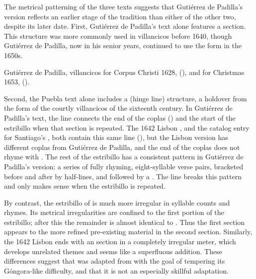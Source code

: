 The metrical patterning of the three texts suggests that Gutiérrez de Padilla's
version reflects an earlier stage of the tradition than either of the other
two, despite its later date.
First, Gutiérrez de Padilla's text alone features a  section.
This structure was more commonly used in villancicos before 1640, though
Gutiérrez de Padilla, now in his senior years, continued to use the form in the
1650s.%
\begin{Footnote}
    Gutiérrez de Padilla, villancicos for Corpus Christi 1628,  (), and for Christmas 1653,  ().
\end{Footnote}
Second, the Puebla text alone includes a  (hinge line)
structure, a holdover from the form of the courtly villancicos of the sixteenth
century.%
    \Autocite[\XXX]{Navarro:Metrica}
In Gutiérrez de Padilla's text, the line 
connects the end of the coplas () and
the start of the estribillo when that section is repeated.
The 1642 Lisbon , and the catalog entry for Santiago's
, both contain this same line (),
but the Lisbon version has different coplas from Gutiérrez de Padilla, and the
end of the coplas does not rhyme with .
The rest of the estribillo has a consistent pattern in Gutiérrez de Padilla's
version: a series of fully rhyming, eight-syllable verse pairs, bracketed
before and after by half-lines, and followed by a .
The line  breaks this pattern and only makes sense when
the estribillo is repeated. 

By contrast, the estribillo of  is much more irregular in
syllable counts and rhymes.
Its metrical irregularities are confined to the first portion of the
estribillo; after this the remainder is almost identical to .
Thus the first section appears  to the more refined
pre-existing material in the second section.
Similarly, the 1642 Lisbon  ends with an  section in
a completely irregular meter, which develops unrelated themes and seems like a
superfluous addition.
These differences suggest that  was adapted from 
with the goal of tempering its Góngora-like difficulty, and that it is not an
especially skillful adaptation.

